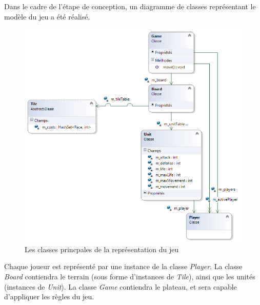 Dans le cadre de l'étape de conception, un diagramme de classes représentant le modèle du jeu a été réalisé.

\begin{figure}[!h]
\centering
\includegraphics[width=\textwidth]{Parties/Images/UML_Princ.png}
\caption{Les classes princpales de la représentation du jeu}
\label{fig:uml_princ}
\end{figure}

Chaque joueur est représenté par une instance de la classe \emph{Player}.
La classe \emph{Board} contiendra le terrain (sous forme d'instances de \emph{Tile}), ainsi que les unités (instances de \emph{Unit}).
La classe \emph{Game} contiendra le plateau, et sera capable d'appliquer les règles du jeu.